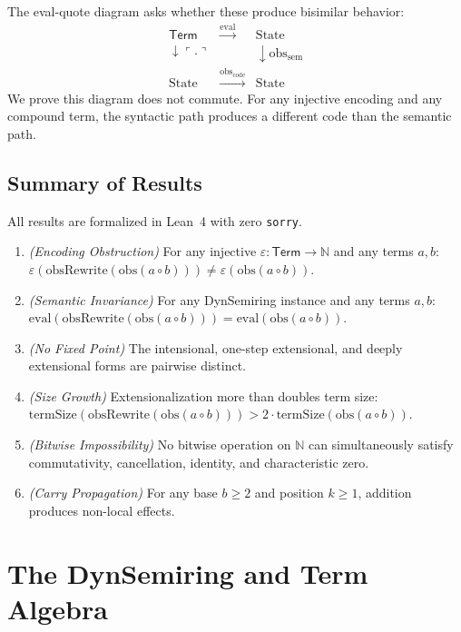 \documentclass[11pt,a4paper]{article}
\theoremstyle{definition}
\theoremstyle{remark}
\newcommand{\compose}{\mathbin{\circ}}
\newcommand{\obs}{\mathrm{obs}}
\newcommand{\Term}{\mathsf{Term}}
\newcommand{\eval}{\mathrm{eval}}
\newcommand{\encode}[1]{\ulcorner #1 \urcorner}
\newcommand{\obsRewrite}{\mathrm{obsRewrite}}
\newcommand{\termSize}{\mathrm{termSize}}
\newcommand{\N}{\mathbb{N}}
\begin{document}
The eval-quote diagram asks whether these produce bisimilar behavior:
\[
\begin{array}{ccc}
  \Term & \xrightarrow{\eval} & \mathrm{State} \\
  \downarrow\scriptstyle{\encode{\cdot}} & & \downarrow\scriptstyle{\obs_{\mathrm{sem}}} \\
  \mathrm{State} & \xrightarrow{\obs_{\mathrm{code}}} & \mathrm{State}
\end{array}
\]
We prove this diagram does not commute. For any injective encoding and any
compound term, the syntactic path produces a different code than the
semantic path.

\subsection{Summary of Results}

All results are formalized in Lean~4 with zero \texttt{sorry}.

\begin{enumerate}[label=\textbf{Theorem \arabic*.}, leftmargin=*]
  \item \emph{(Encoding Obstruction)} For any injective
    $\varepsilon : \Term \to \N$ and any terms $a, b$:
    $\varepsilon(\obsRewrite(\obs(a \compose b)))
    \neq \varepsilon(\obs(a \compose b))$.
  \item \emph{(Semantic Invariance)} For any DynSemiring instance and any
    terms $a, b$:
    $\eval(\obsRewrite(\obs(a \compose b)))
    = \eval(\obs(a \compose b))$.
  \item \emph{(No Fixed Point)} The intensional, one-step extensional, and
    deeply extensional forms are pairwise distinct.
  \item \emph{(Size Growth)} Extensionalization more than doubles term size:
    $\termSize(\obsRewrite(\obs(a \compose b)))
    > 2 \cdot \termSize(\obs(a \compose b))$.
  \item \emph{(Bitwise Impossibility)} No bitwise operation on $\N$ can
    simultaneously satisfy commutativity, cancellation, identity, and
    characteristic zero.
  \item \emph{(Carry Propagation)} For any base $b \geq 2$ and position
    $k \geq 1$, addition produces non-local effects.
\end{enumerate}

\section{The DynSemiring and Term Algebra}
\label{sec:dynsemiring}
\end{document}
